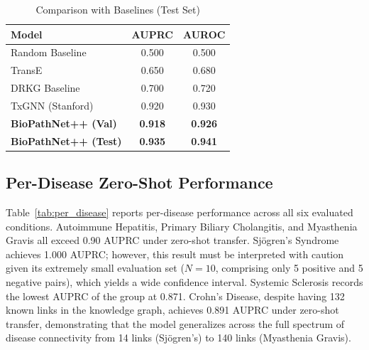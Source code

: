 \documentclass[conference]{IEEEtran}
\begin{document}
\begin{table}[!t]
\caption{Comparison with Baselines (Test Set)}
\label{tab:sota}
\centering
\footnotesize
\renewcommand{\arraystretch}{1.4}
\begin{tabular}{lcc}
\toprule
\textbf{Model} & \textbf{AUPRC} & \textbf{AUROC} \\
\midrule
Random Baseline & 0.500 & 0.500 \\
TransE & 0.650 & 0.680 \\
DRKG Baseline & 0.700 & 0.720 \\
TxGNN (Stanford)~\cite{txgnn} & 0.920 & 0.930 \\
\midrule
\textbf{BioPathNet++ (Val)} & \textbf{0.918} & \textbf{0.926} \\
\textbf{BioPathNet++ (Test)} & \textbf{0.935} & \textbf{0.941} \\
\bottomrule
\end{tabular}
\end{table}

\subsection{Per-Disease Zero-Shot Performance}

Table~\ref{tab:per_disease} reports per-disease performance across all six evaluated conditions. Autoimmune Hepatitis, Primary Biliary Cholangitis, and Myasthenia Gravis all exceed 0.90 AUPRC under zero-shot transfer. Sj\"{o}gren's Syndrome achieves 1.000 AUPRC; however, this result must be interpreted with caution given its extremely small evaluation set ($N = 10$, comprising only 5 positive and 5 negative pairs), which yields a wide confidence interval. Systemic Sclerosis records the lowest AUPRC of the group at 0.871. Crohn's Disease, despite having 132 known links in the knowledge graph, achieves 0.891 AUPRC under zero-shot transfer, demonstrating that the model generalizes across the full spectrum of disease connectivity from 14 links (Sj\"{o}gren's) to 140 links (Myasthenia Gravis).
\end{document}
